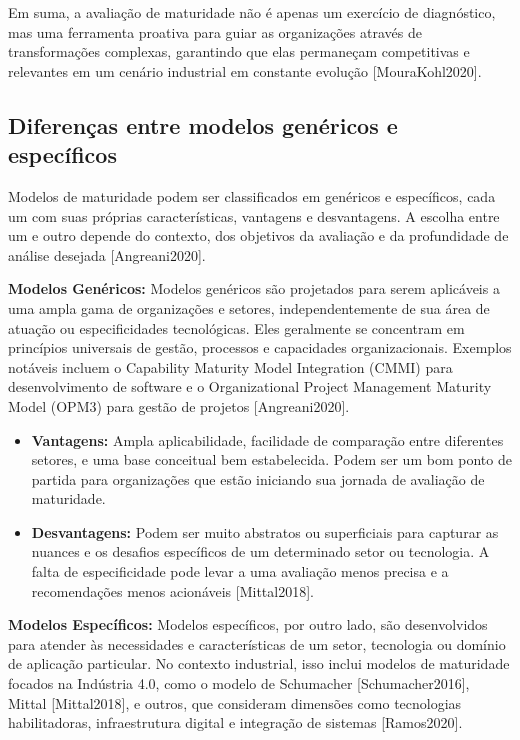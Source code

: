 Em suma, a avaliação de maturidade não é apenas um exercício de diagnóstico, mas uma ferramenta proativa para guiar as organizações através de transformações complexas, garantindo que elas permaneçam competitivas e relevantes em um cenário industrial em constante evolução [MouraKohl2020].

\subsection{Diferenças entre modelos genéricos e específicos}

Modelos de maturidade podem ser classificados em genéricos e específicos, cada um com suas próprias características, vantagens e desvantagens. A escolha entre um e outro depende do contexto, dos objetivos da avaliação e da profundidade de análise desejada [Angreani2020].

\textbf{Modelos Genéricos:}
Modelos genéricos são projetados para serem aplicáveis a uma ampla gama de organizações e setores, independentemente de sua área de atuação ou especificidades tecnológicas. Eles geralmente se concentram em princípios universais de gestão, processos e capacidades organizacionais. Exemplos notáveis incluem o Capability Maturity Model Integration (CMMI) para desenvolvimento de software e o Organizational Project Management Maturity Model (OPM3) para gestão de projetos [Angreani2020].

\begin{itemize}
    \item \textbf{Vantagens:} Ampla aplicabilidade, facilidade de comparação entre diferentes setores, e uma base conceitual bem estabelecida. Podem ser um bom ponto de partida para organizações que estão iniciando sua jornada de avaliação de maturidade.
    \item \textbf{Desvantagens:} Podem ser muito abstratos ou superficiais para capturar as nuances e os desafios específicos de um determinado setor ou tecnologia. A falta de especificidade pode levar a uma avaliação menos precisa e a recomendações menos acionáveis [Mittal2018].
\end{itemize}

\textbf{Modelos Específicos:}
Modelos específicos, por outro lado, são desenvolvidos para atender às necessidades e características de um setor, tecnologia ou domínio de aplicação particular. No contexto industrial, isso inclui modelos de maturidade focados na Indústria 4.0, como o modelo de Schumacher [Schumacher2016], Mittal [Mittal2018], e outros, que consideram dimensões como tecnologias habilitadoras, infraestrutura digital e integração de sistemas [Ramos2020].

